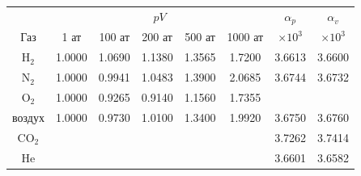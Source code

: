 \documentclass[12pt,epsfig,color,russian]{article}
\begin{document}
\begin{tabular}{|c||c|c|c|c|c||c||c|}\hline
        & \multicolumn{5}{|c||}{$pV$}& $\alpha_p$& $\alpha_v$\\ \cline{2-6}
Газ     & 1 ат & 100 ат & 200 ат & 500 ат & 1000 ат & $\times10^3$ & $\times10^3$\\ \hline \hline
H$_2$   & 1.0000 & 1.0690 & 1.1380 & 1.3565 & 1.7200 & 3.6613 & 3.6600 \\ \hline
N$_2$   & 1.0000 & 0.9941 & 1.0483 & 1.3900 & 2.0685 & 3.6744 & 3.6732 \\ \hline
O$_2$   & 1.0000 & 0.9265 & 0.9140 & 1.1560 & 1.7355 &        &        \\ \hline
воздух  & 1.0000 & 0.9730 & 1.0100 & 1.3400 & 1.9920 & 3.6750 & 3.6760 \\ \hline
CO$_2$  &        &        &        &        &        & 3.7262 & 3.7414 \\ \hline
He      &        &        &        &        &        & 3.6601 & 3.6582 \\ \hline
\end{tabular}\\
\end{document}
